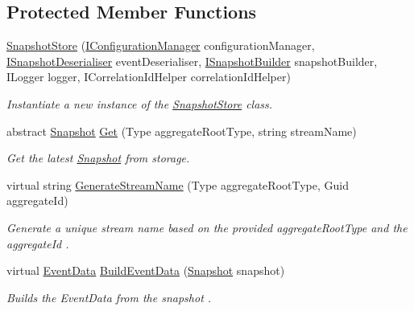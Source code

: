 \subsection*{Protected Member Functions}
\begin{DoxyCompactItemize}
\item 
\hyperlink{classCqrs_1_1Snapshots_1_1SnapshotStore_aa8ab186f864443c7d9647a4522864a84_aa8ab186f864443c7d9647a4522864a84}{Snapshot\+Store} (\hyperlink{interfaceCqrs_1_1Configuration_1_1IConfigurationManager}{I\+Configuration\+Manager} configuration\+Manager, \hyperlink{interfaceCqrs_1_1Events_1_1ISnapshotDeserialiser}{I\+Snapshot\+Deserialiser} event\+Deserialiser, \hyperlink{interfaceCqrs_1_1Events_1_1ISnapshotBuilder}{I\+Snapshot\+Builder} snapshot\+Builder, I\+Logger logger, I\+Correlation\+Id\+Helper correlation\+Id\+Helper)
\begin{DoxyCompactList}\small\item\em Instantiate a new instance of the \hyperlink{classCqrs_1_1Snapshots_1_1SnapshotStore}{Snapshot\+Store} class. \end{DoxyCompactList}\item 
abstract \hyperlink{classCqrs_1_1Snapshots_1_1Snapshot}{Snapshot} \hyperlink{classCqrs_1_1Snapshots_1_1SnapshotStore_ab2ecab1a665c0f2097929d028fe4ac69_ab2ecab1a665c0f2097929d028fe4ac69}{Get} (Type aggregate\+Root\+Type, string stream\+Name)
\begin{DoxyCompactList}\small\item\em Get the latest \hyperlink{classCqrs_1_1Snapshots_1_1Snapshot}{Snapshot} from storage. \end{DoxyCompactList}\item 
virtual string \hyperlink{classCqrs_1_1Snapshots_1_1SnapshotStore_a8ff909b77429c8a924376962bba36849_a8ff909b77429c8a924376962bba36849}{Generate\+Stream\+Name} (Type aggregate\+Root\+Type, Guid aggregate\+Id)
\begin{DoxyCompactList}\small\item\em Generate a unique stream name based on the provided {\itshape aggregate\+Root\+Type}  and the {\itshape aggregate\+Id} . \end{DoxyCompactList}\item 
virtual \hyperlink{classCqrs_1_1Events_1_1EventData}{Event\+Data} \hyperlink{classCqrs_1_1Snapshots_1_1SnapshotStore_a61f0715eab97e305cd2bf04a5b74565e_a61f0715eab97e305cd2bf04a5b74565e}{Build\+Event\+Data} (\hyperlink{classCqrs_1_1Snapshots_1_1Snapshot}{Snapshot} snapshot)
\begin{DoxyCompactList}\small\item\em Builds the Event\+Data from the {\itshape snapshot} . \end{DoxyCompactList}\end{DoxyCompactItemize}
